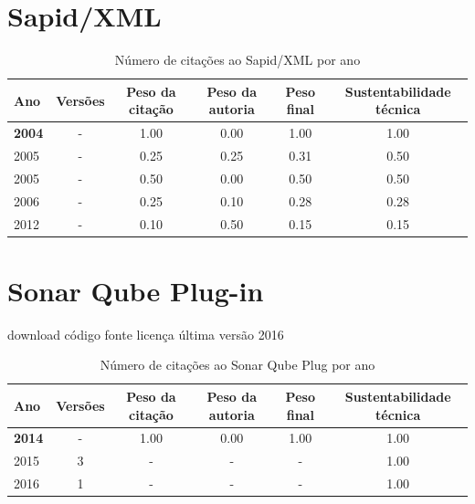 \section{Sapid/XML}


\begin{table}[H]
\caption{Número de citações ao Sapid/XML por ano}
\centering
\begin{tabular}{| l | c | c | c | c | c |}
  \hline
  Ano & Versões & Peso da citação & Peso da autoria & Peso final & Sustentabilidade técnica \\
  \hline
            {\bf 2004}
          &
          -
          &
          1.00
          &
          0.00
          &
          1.00
          &
            {\color{blue} 1.00}
          \\
\hline
            2005
          &
          -
          &
          0.25
          &
          0.25
          &
          0.31
          &
            {\color{blue} 0.50}
          \\
            2005
          &
          -
          &
          0.50
          &
          0.00
          &
          0.50
          &
            {\color{blue} 0.50}
          \\
\hline
            2006
          &
          -
          &
          0.25
          &
          0.10
          &
          0.28
          &
            {\color{red} 0.28}
          \\
\hline
            2012
          &
          -
          &
          0.10
          &
          0.50
          &
          0.15
          &
            {\color{red} 0.15}
          \\
\hline
\end{tabular}
\end{table}



\section{Sonar Qube Plug-in}
\checkmark download
\checkmark código fonte
\checkmark licença
\checkmark última versão 2016


\begin{table}[H]
\caption{Número de citações ao Sonar Qube Plug por ano}
\centering
\begin{tabular}{| l | c | c | c | c | c |}
  \hline
  Ano & Versões & Peso da citação & Peso da autoria & Peso final & Sustentabilidade técnica \\
  \hline
            {\bf 2014}
          &
          -
          &
          1.00
          &
          0.00
          &
          1.00
          &
            {\color{blue} 1.00}
          \\
\hline
        2015 & 3 & - & - & -
        &
          {\color{blue} 1.00}
        \\
\hline
        2016 & 1 & - & - & -
        &
          {\color{blue} 1.00}
        \\
\hline
\end{tabular}
\end{table}



